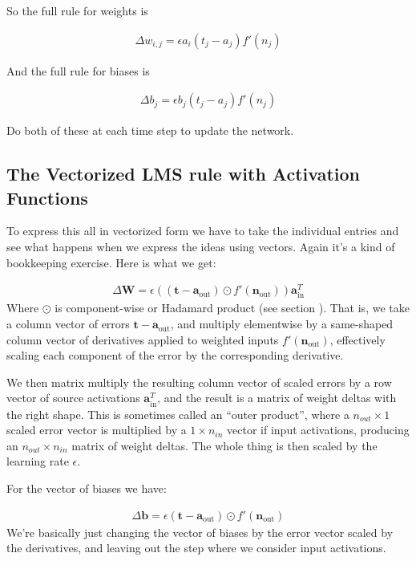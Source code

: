 So the full rule for weights is

\begin{eqnarray*}
\Delta w_{i,j}  =  \epsilon a_i (t_j - a_j) f' (n_j)
\end{eqnarray*}

And the full rule for biases is 

\begin{eqnarray*}
\Delta b_{j}  =  \epsilon b_j (t_j - a_j) f' (n_j)
\end{eqnarray*}

Do both of these at each time step to update the network.

\subsection{The Vectorized LMS rule with Activation Functions}

To express this all in vectorized form we have to take the individual entries and see what happens when we express the ideas using vectors.  Again it's a kind of bookkeeping exercise. Here is what we get:

\begin{eqnarray*}
\Delta \mathbf{W}  =  \epsilon ((\mathbf{t} - \mathbf{a}_{\text{out}}) \odot f'( \mathbf{n}_{\text{out}})) \mathbf{a}_{\text{in}}^T
\end{eqnarray*}
Where $\odot$ is component-wise or Hadamard product (see section ). That is, we take a column vector of errors $\mathbf{t} - \mathbf{a}_{\text{out}}$, and multiply elementwise by a same-shaped column vector of derivatives applied to weighted inputs $f'( \mathbf{n}_{\text{out}})$, effectively scaling each component of the error by the corresponding derivative. 

We then matrix multiply the resulting column vector of scaled errors by a row vector of source activations $ \mathbf{a}_{\text{in}}^T$, and the result is a matrix of weight deltas with the right shape. This is sometimes called an ``outer product'', where a $n_{out} \times 1$ scaled error vector is multiplied by a  $1 \times n_{in}$ vector if input activations, producing an $n_{out} \times n_{in}$ matrix of weight deltas. The whole thing is then scaled by the learning rate $\epsilon$.

For the vector of biases we have:

\begin{eqnarray*}
\Delta \mathbf{b}  =  \epsilon (\mathbf{t} - \mathbf{a}_{\text{out}}) \odot f'( \mathbf{n}_{\text{out}})
\end{eqnarray*}
We're basically just changing the vector of biases by the error vector scaled by the derivatives, and leaving out the step where we consider input activations.

